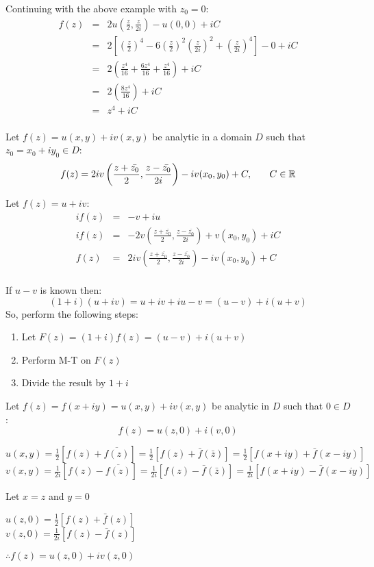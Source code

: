 \documentclass[letterpaper,12pt,fleqn]{article}
\newcommand{\conj}[1]{\bar{#1}}
\newcommand{\Conj}[1]{\overline{#1}}
\begin{document}
\begin{example}
  Continuing with the above example with $z_0=0$:
  \begin{eqnarray*}
    f(z) &=& 2u\left(\frac{z}{2},\frac{z}{2i}\right)-u(0,0)+iC \\
    &=& 2\left[\left(\frac{z}{2}\right)^4-
      6\left(\frac{z}{2}\right)^2\left(\frac{z}{2i}\right)^2+
      \left(\frac{z}{2i}\right)^4\right]-0+iC \\
    &=& 2\left(\frac{z^4}{16}+\frac{6z^4}{16}+\frac{z^4}{16}\right)+iC \\
    &=& 2\left(\frac{8z^4}{16}\right)+iC \\
    &=& z^4+iC \\
  \end{eqnarray*}
\end{example}

\begin{theorem}
  Let $f(z)=u(x,y)+iv(x,y)$ be analytic in a domain $D$ such that
  $z_0=x_0+iy_0\in D$:
  \[f(z)=2iv\left(\frac{z+\conj{z_0}}{2},\frac{z-\conj{z_0}}{2i}\right)-
  iv(x_0,y_0)+C,\hspace{0.25in}C\in\R\]
\end{theorem}

\begin{theproof}
  Let $f(z)=u+iv$:
  \begin{eqnarray*}
    if(z) &=& -v+iu \\
    if(z) &=& -2v\left(\frac{z+\Conj{z_0}}{2},\frac{z-\Conj{z_0}}{2i}\right)
    +v(x_0,y_0)+iC \\
    f(z) &=& 2iv\left(\frac{z+\Conj{z_0}}{2},\frac{z-\Conj{z_0}}{2i}\right)
    -iv(x_0,y_0)+C \\
  \end{eqnarray*}
\end{theproof}
\newpage
If $u-v$ is known then:
\[(1+i)(u+iv)=u+iv+iu-v=(u-v)+i(u+v)\]
So, perform the following steps:
\begin{enumerate}
\item Let $F(z)=(1+i)f(z)=(u-v)+i(u+v)$
\item Perform M-T on $F(z)$
\item Divide the result by $1+i$
\end{enumerate}

\begin{theorem}
  Let $f(z)=f(x+iy)=u(x,y)+iv(x,y)$ be analytic in $D$ such that $0\in D$:
  \[f(z)=u(z,0)+i(v,0)\]
\end{theorem}

\begin{theproof}
  $u(x,y)=\frac{1}{2}[f(z)+\Conj{f(z)}]=\frac{1}{2}[f(z)+\conj{f}(\conj{z})]=
  \frac{1}{2}[f(x+iy)+\conj{f}(x-iy)]$ \\
  $v(x,y)=\frac{1}{2i}[f(z)-\Conj{f(z)}]=\frac{1}{2i}[f(z)-\conj{f}(\conj{z})]=
  \frac{1}{2i}[f(x+iy)-\conj{f}(x-iy)]$

  Let $x=z$ and $y=0$

  $u(z,0)=\frac{1}{2}[f(z)+\conj{f}(z)]$ \\
  $v(z,0)=\frac{1}{2i}[f(z)-\conj{f}(z)]$

  $\therefore f(z)=u(z,0)+iv(z,0)$
\end{theproof}
\end{document}
